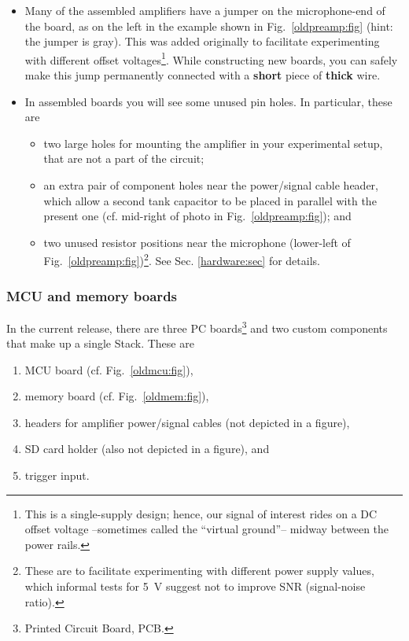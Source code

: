 \documentclass[letterpaper]{article}
\begin{document}
\begin{itemize}
\item Many of the assembled amplifiers have a jumper on the
  microphone-end of the board, as on the left in the example shown in
  Fig.~\ref{oldpreamp:fig} (hint: the jumper is gray). This was added
  originally to facilitate experimenting with different offset
  voltages\footnote{This is a single-supply design; hence, our signal
    of interest rides on a DC offset voltage --sometimes called the
    ``virtual ground''-- midway between the power rails.}. While
  constructing new boards, you can safely make this jump permanently
  connected with a \textbf{short} piece of \textbf{thick} wire.

\item In assembled boards you will see some unused pin holes. In
  particular, these are
\begin{itemize}
\item two large holes for mounting the amplifier in your experimental
  setup, that are not a part of the circuit;

\item an extra pair of component holes near the power/signal cable
  header, which allow a second tank capacitor to be placed in parallel
  with the present one (cf. mid-right of photo in
  Fig.~\ref{oldpreamp:fig}); and

\item two unused resistor positions near the microphone (lower-left of
  Fig.~\ref{oldpreamp:fig})\footnote{These are to facilitate
    experimenting with different power supply values, which informal
    tests for 5~V suggest not to improve SNR (signal-noise
    ratio).}. See Sec. \ref{hardware:sec} for details.
\end{itemize}
\end{itemize}

\subsubsection{MCU and memory boards}

In the current release, there are three PC boards\footnote{Printed
  Circuit Board, PCB.} and two custom components that make up a single
Stack. These are
\begin{enumerate}
\item MCU board (cf. Fig.~\ref{oldmcu:fig}),

\item memory board (cf. Fig.~\ref{oldmem:fig}),

\item headers for amplifier power/signal cables (not depicted in a figure),

\item SD card holder (also not depicted in a figure), and

\item trigger input.
\end{enumerate}
\end{document}

